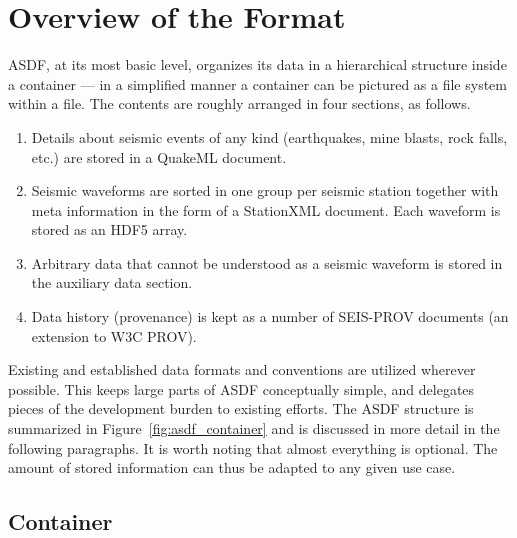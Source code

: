 \section{Overview of the Format}

ASDF, at its most basic level, organizes its data in a hierarchical structure
inside a container --- in a simplified manner a container can be pictured as a
file system within a file. The contents are roughly arranged in four sections,
as follows.

\begin{enumerate}
    \item Details about seismic events of any kind (earthquakes, mine blasts,
        rock falls, etc.) are stored in a QuakeML document.
    \item Seismic waveforms are sorted in one group per seismic station
        together with meta information in the form of a StationXML
        document. Each waveform is stored as an HDF5 array.
    \item Arbitrary data that cannot be understood as a seismic waveform is
        stored in the auxiliary data section.
    \item Data history (provenance) is kept as a number of SEIS-PROV
     documents (an extension to W3C PROV).
\end{enumerate}

Existing and established data formats and conventions are utilized wherever
possible. This keeps large parts of ASDF conceptually simple, and delegates
pieces of the development burden to existing efforts. The ASDF structure is
summarized in Figure~\ref{fig:asdf_container} and is discussed in more detail
in the following paragraphs. It is worth noting that almost everything is
optional. The amount of stored information can thus be adapted to any given use
case.

\subsection{Container}

